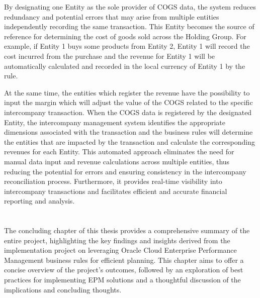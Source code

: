 \documentclass[12pt,a4paper,openright,twoside]{book}
\begin{document}



By designating one Entity as the sole provider of COGS data, the system reduces redundancy and potential errors that may arise from multiple entities independently recording the same transaction. 
%
This Entity becomes the source of reference for determining the cost of goods sold across the Holding Group.
%
For example, if Entity 1 buys some products from Entity 2, Entity 1 will record the cost incurred from the purchase and the revenue for Entity 1 will be automatically calculated and recorded in the local currency of Entity 1 by the rule.

At the same time, the entities which register the revenue have the possibility to input the margin which will adjust the value of the COGS related to the specific intercompany transaction.
%
When the COGS data is registered by the designated Entity, the intercompany management system identifies the appropriate dimensions associated with the transaction and the business rules will determine the entities that are impacted by the transaction and calculate the corresponding revenues for each Entity.
%
This automated approach eliminates the need for manual data input and revenue calculations across multiple entities, thus reducing the potential for errors and ensuring consistency in the intercompany reconciliation process. 
%
Furthermore, it provides real-time visibility into intercompany transactions and facilitates efficient and accurate financial reporting and analysis.

\chapter{\conclusionsname}
\label{chap:conclusions}

The concluding chapter of this thesis provides a comprehensive summary of the entire project, highlighting the key findings and insights derived from the implementation project on leveraging Oracle Cloud Enterprise Performance Management business rules for efficient planning. 
%
This chapter aims to offer a concise overview of the project's outcomes, followed by an exploration of best practices for implementing EPM solutions and a thoughtful discussion of the implications and concluding thoughts.
\end{document}
